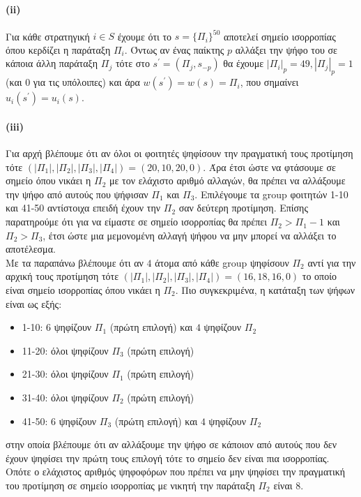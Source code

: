 \documentclass[a4paper,11pt]{article}
\begin{document}
\paragraph{(ii)} Για κάθε στρατηγική $i \in S$ έχουμε ότι το $s = \{\Pi_i\}^{50}$ αποτελεί σημείο ισορροπίας όπου κερδίζει η παράταξη $\Pi_i$.
Όντως αν ένας παίκτης $p$ αλλάξει την ψήφο του σε κάποια άλλη παράταξη $\Pi_j$ τότε στο $s^\prime = (\Pi_j,s_{-p})$ θα έχουμε $|\Pi_i|_p=49, |\Pi_j|_p=1$ (και $0$ για τις υπόλοιπες) και άρα $w(s^\prime) = w(s) = \Pi_i$, που σημαίνει $u_i(s^\prime) = u_i(s)$.

\paragraph{(iii)} Για αρχή βλέπουμε ότι αν όλοι οι φοιτητές ψηφίσουν την πραγματική τους προτίμηση τότε $(|\Pi_1|,|\Pi_2|,|\Pi_3|,|\Pi_4|) = (20,10,20,0)$.
Άρα έτσι ώστε να φτάσουμε σε σημείο όπου νικάει η $\Pi_2$ με τον ελάχιστο αριθμό αλλαγών, θα πρέπει να αλλάξουμε την ψήφο από αυτούς που ψήφισαν $\Pi_1$ και $\Pi_3$.
Επιλέγουμε τα group φοιτητών 1-10 και 41-50 αντίστοιχα επειδή έχουν την $\Pi_2$ σαν δεύτερη προτίμηση.
Επίσης παρατηρούμε ότι για να είμαστε σε σημείο ισορροπίας θα πρέπει $\Pi_2 > \Pi_1-1$ και $\Pi_2 > \Pi_3$, έτσι ώστε μια μεμονομένη αλλαγή ψήφου να μην μπορεί να αλλάξει το αποτέλεσμα.
\\[8pt]
Με τα παραπάνω βλέπουμε ότι αν $4$ άτομα από κάθε group ψηφίσουν $\Pi_2$ αντί για την αρχική τους προτίμηση τότε $(|\Pi_1|,|\Pi_2|,|\Pi_3|,|\Pi_4|) = (16,18,16,0)$ το οποίο είναι σημείο ισορροπίας όπου νικάει η $\Pi_2$.
Πιο συγκεκριμένα, η κατάταξη των ψήφων είναι ως εξής:
\begin{itemize}
	\item 1-10: $6$ ψηφίζουν $\Pi_1$ (πρώτη επιλογή) και $4$ ψηφίζουν $\Pi_2$
	\item 11-20: όλοι ψηφίζουν $\Pi_3$ (πρώτη επιλογή)
	\item 21-30: όλοι ψηφίζουν $\Pi_1$ (πρώτη επιλογή)
	\item 31-40: όλοι ψηφίζουν $\Pi_2$ (πρώτη επιλογή)
	\item 41-50: $6$ ψηφίζουν $\Pi_3$ (πρώτη επιλογή) και $4$ ψηφίζουν $\Pi_2$
\end{itemize}
στην οποία βλέπουμε ότι αν αλλάξουμε την ψήφο σε κάποιον από αυτούς που δεν έχουν ψηφίσει την πρώτη τους επιλογή τότε το σημείο δεν είναι πια ισορροπίας.
\\[8pt]
Οπότε ο ελάχιστος αριθμός ψηφοφόρων που πρέπει να μην ψηφίσει την πραγματική του προτίμηση σε σημείο ισορροπίας με νικητή την παράταξη $\Pi_2$ είναι $8$.
\end{document}
